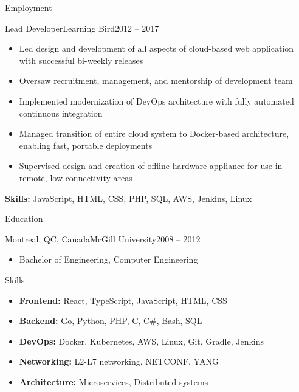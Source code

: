 \documentclass[]{cv}
\begin{document}
\begin{cvsection}{Employment}
		\begin{cvsubsection}{Lead Developer}{Learning Bird}{2012 -- 2017}
			\begin{itemize}
				\item Led design and development of all aspects of cloud-based web application with successful bi-weekly releases
				\item Oversaw recruitment, management, and mentorship of development team
				\item Implemented modernization of DevOps architecture with fully automated continuous integration
				\item Managed transition of entire cloud system to Docker-based architecture, enabling fast, portable deployments
				\item Supervised design and creation of offline hardware appliance for use in remote, low-connectivity areas
			\end{itemize}
			\small{\textbf{Skills:} JavaScript, HTML, CSS, PHP, SQL, AWS, Jenkins, Linux}
		\end{cvsubsection}
	\end{cvsection}

	\begin{cvsection}{Education}
		\begin{cvsubsection}{Montreal, QC, Canada}{McGill University}{2008 -- 2012}
			\begin{itemize}
				\item Bachelor of Engineering, Computer Engineering
			\end{itemize}
		\end{cvsubsection}
	\end{cvsection}

	\begin{cvsection}{Skills}
		\begin{cvsubsection}{}{}{}
			\begin{itemize}
				\item \textbf{Frontend:} React, TypeScript, JavaScript, HTML, CSS
				\item \textbf{Backend:} Go, Python, PHP, C, C\#, Bash, SQL
				\item \textbf{DevOps:} Docker, Kubernetes, AWS, Linux, Git, Gradle, Jenkins
				\item \textbf{Networking:} L2-L7 networking, NETCONF, YANG
				\item \textbf{Architecture:} Microservices, Distributed systems
			\end{itemize}
		\end{cvsubsection}
	\end{cvsection}
\end{document}
